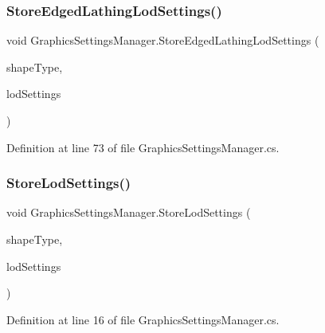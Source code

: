 \subsubsection{\texorpdfstring{StoreEdgedLathingLodSettings()}{StoreEdgedLathingLodSettings()}}
{\footnotesize\ttfamily void Graphics\+Settings\+Manager.\+Store\+Edged\+Lathing\+Lod\+Settings (\begin{DoxyParamCaption}\item[{\mbox{\hyperlink{_shape_types_8cs_af0e24915ca1b4c216da56b86a5f3de13}{Shape\+Types}}}]{shape\+Type,  }\item[{List$<$ \mbox{\hyperlink{class_edged_lathing_lod_settings}{Edged\+Lathing\+Lod\+Settings}} $>$}]{lod\+Settings }\end{DoxyParamCaption})}



Definition at line 73 of file Graphics\+Settings\+Manager.\+cs.

\mbox{\label{class_graphics_settings_manager_ae8cb1fa784876b8a1a7907fa0a785757}} 
\subsubsection{\texorpdfstring{StoreLodSettings()}{StoreLodSettings()}}
{\footnotesize\ttfamily void Graphics\+Settings\+Manager.\+Store\+Lod\+Settings (\begin{DoxyParamCaption}\item[{\mbox{\hyperlink{_shape_types_8cs_af0e24915ca1b4c216da56b86a5f3de13}{Shape\+Types}}}]{shape\+Type,  }\item[{List$<$ \mbox{\hyperlink{class_lod_settings}{Lod\+Settings}} $>$}]{lod\+Settings }\end{DoxyParamCaption})}



Definition at line 16 of file Graphics\+Settings\+Manager.\+cs.

\mbox{\label{class_graphics_settings_manager_af0136cd657b53d839c722092cfd691f2}} 
